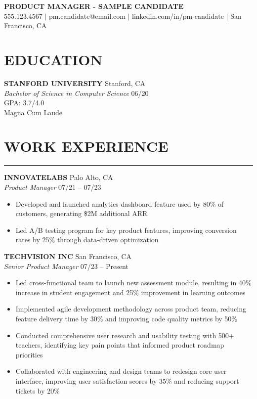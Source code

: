 \documentclass[10pt,letterpaper]{article}
\newcommand{\sectionline}{\par\vspace{-0.5em}\noindent\rule{\textwidth}{0.6pt}\vspace{0.3em}\par}
\begin{document}
\begin{center}
  {\LARGE \textbf{PRODUCT MANAGER - SAMPLE CANDIDATE}}\\
  555.123.4567 $|$ pm.candidate@email.com $|$ linkedin.com/in/pm-candidate $|$ San Francisco, CA
\end{center}
\vspace{0.5em}

\section*{EDUCATION}

\noindent\textbf{STANFORD UNIVERSITY} \hfill Stanford, CA\\
\textit{Bachelor of Science in Computer Science} \hfill 06/20
\\GPA: 3.7/4.0\\Magna Cum Laude

\section*{WORK EXPERIENCE}
\sectionline

\noindent\textbf{INNOVATELABS} \hfill Palo Alto, CA\\
\textit{Product Manager} \hfill 07/21 -- 07/23
\begin{itemize}
  \item Developed and launched analytics dashboard feature used by 80\% of customers, generating \$2M additional ARR
  \item Led A/B testing program for key product features, improving conversion rates by 25\% through data-driven optimization
\end{itemize}

\noindent\textbf{TECHVISION INC} \hfill San Francisco, CA\\
\textit{Senior Product Manager} \hfill 07/23 -- Present
\begin{itemize}
  \item Led cross-functional team to launch new assessment module, resulting in 40\% increase in student engagement and 25\% improvement in learning outcomes
  \item Implemented agile development methodology across product team, reducing feature delivery time by 30\% and improving code quality metrics by 50\%
  \item Conducted comprehensive user research and usability testing with 500+ teachers, identifying key pain points that informed product roadmap priorities
  \item Collaborated with engineering and design teams to redesign core user interface, improving user satisfaction scores by 35\% and reducing support tickets by 20\%
\end{itemize}
\end{document}

